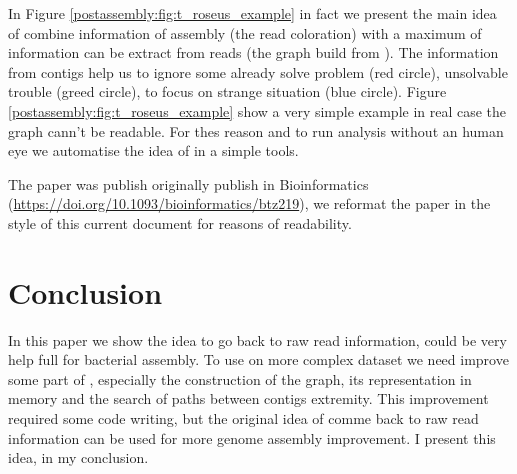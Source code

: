\documentclass[main.tex]{subfiles}
\begin{document}
In Figure \ref{postassembly:fig:t_roseus_example} in fact we present the main idea of \knot combine information of assembly (the read coloration) with a maximum of information can be extract from reads (the \OLC graph build from \minimap). The information from contigs help us to ignore some already solve problem (red circle), unsolvable trouble (greed circle), to focus on strange situation (blue circle). Figure \ref{postassembly:fig:t_roseus_example} show a very simple example in real case the \OLC graph cann't be readable. For thes reason and to run analysis without an human eye we automatise the idea of \knot in a simple tools.

The paper was publish originally publish in Bioinformatics (\url{https://doi.org/10.1093/bioinformatics/btz219}), we reformat the paper in the style of this current document for reasons of readability.





\section{Conclusion}

In this paper we show the idea to go back to raw read information, could be very help full for bacterial assembly. To use \knot on more complex dataset we need improve some part of \knot, especially the construction of the graph, its representation in memory and the search of paths between contigs extremity. This improvement required some code writing, but the original idea of comme back to raw read information can be used for more genome assembly improvement. I present this idea, in my conclusion.


\end{document}
